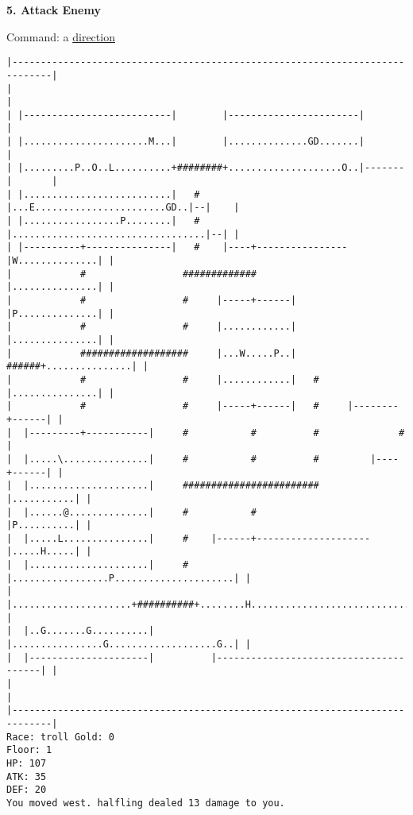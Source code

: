 \documentclass[11pt]{article}
\theoremstyle{plain}
\begin{document}
\textbf{5. Attack Enemy}

Command: a \underline{direction}

\begin{Verbatim}[fontsize=\small]
|-----------------------------------------------------------------------------|
|                                                                             |
| |--------------------------|        |-----------------------|               |
| |......................M...|        |..............GD.......|               |
| |.........P..O..L..........+########+....................O..|-------|       |
| |..........................|   #    |...E.......................GD..|--|    |
| |.................P........|   #    |..................................|--| |
| |----------+---------------|   #    |----+----------------|W..............| |
|            #                 #############                |...............| |
|            #                 #     |-----+------|         |P..............| |
|            #                 #     |............|         |...............| |
|            ###################     |...W.....P..|   ######+...............| |
|            #                 #     |............|   #     |...............| |
|            #                 #     |-----+------|   #     |--------+------| |
|  |---------+-----------|     #           #          #              #        |
|  |.....\...............|     #           #          #         |----+------| |
|  |.....................|     ########################         |...........| |
|  |......@..............|     #           #                    |P..........| |
|  |.....L...............|     #    |------+--------------------|.....H.....| |
|  |.....................|     #    |.................P.....................| |
|  |.....................+##########+........H..............................| |
|  |..G.......G..........|          |................G...................G..| |
|  |---------------------|          |---------------------------------------| |
|                                                                             |
|-----------------------------------------------------------------------------|
Race: troll Gold: 0                                                    Floor: 1
HP: 107
ATK: 35
DEF: 20
You moved west. halfling dealed 13 damage to you. 
\end{Verbatim}
\end{document}
